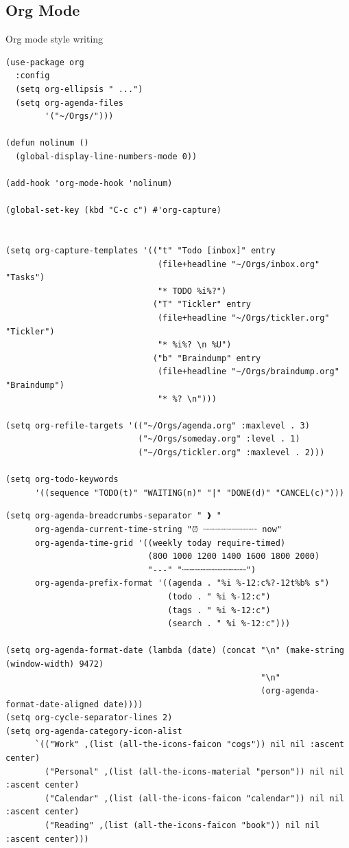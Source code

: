 \documentclass[11pt]{article}
\begin{document}
\subsection{Org Mode}
\label{sec:orgfc55c86}

Org mode style writing

\begin{verbatim}
(use-package org
  :config
  (setq org-ellipsis " ...")
  (setq org-agenda-files
        '("~/Orgs/")))

(defun nolinum ()
  (global-display-line-numbers-mode 0))

(add-hook 'org-mode-hook 'nolinum)

(global-set-key (kbd "C-c c") #'org-capture)


(setq org-capture-templates '(("t" "Todo [inbox]" entry
                               (file+headline "~/Orgs/inbox.org" "Tasks")
                               "* TODO %i%?")
                              ("T" "Tickler" entry
                               (file+headline "~/Orgs/tickler.org" "Tickler")
                               "* %i%? \n %U")
                              ("b" "Braindump" entry
                               (file+headline "~/Orgs/braindump.org" "Braindump")
                               "* %? \n")))

(setq org-refile-targets '(("~/Orgs/agenda.org" :maxlevel . 3)
                           ("~/Orgs/someday.org" :level . 1)
                           ("~/Orgs/tickler.org" :maxlevel . 2)))

(setq org-todo-keywords
      '((sequence "TODO(t)" "WAITING(n)" "|" "DONE(d)" "CANCEL(c)")))

\end{verbatim}

\begin{verbatim}
(setq org-agenda-breadcrumbs-separator " ❱ "
      org-agenda-current-time-string "⏰ ┈┈┈┈┈┈┈┈┈┈┈ now"
      org-agenda-time-grid '((weekly today require-timed)
                             (800 1000 1200 1400 1600 1800 2000)
                             "---" "┈┈┈┈┈┈┈┈┈┈┈┈┈")
      org-agenda-prefix-format '((agenda . "%i %-12:c%?-12t%b% s")
                                 (todo . " %i %-12:c")
                                 (tags . " %i %-12:c")
                                 (search . " %i %-12:c")))

(setq org-agenda-format-date (lambda (date) (concat "\n" (make-string (window-width) 9472)
                                                    "\n"
                                                    (org-agenda-format-date-aligned date))))
(setq org-cycle-separator-lines 2)
(setq org-agenda-category-icon-alist
      `(("Work" ,(list (all-the-icons-faicon "cogs")) nil nil :ascent center)
        ("Personal" ,(list (all-the-icons-material "person")) nil nil :ascent center)
        ("Calendar" ,(list (all-the-icons-faicon "calendar")) nil nil :ascent center)
        ("Reading" ,(list (all-the-icons-faicon "book")) nil nil :ascent center)))
\end{verbatim}
\end{document}
